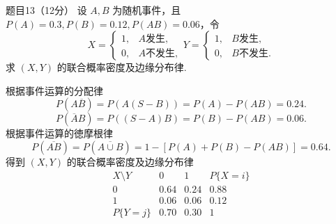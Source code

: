 \documentclass{article}
\begin{document}
\begin{question}{题目13（12分）}
    设 $A,B$ 为随机事件，且 $P(A) = 0.3, P(B) = 0.12, P(AB) = 0.06$，令
    $$
        X = \begin{cases}
            1, & A\text{发生},  \\
            0, & A\text{不发生},
        \end{cases}
        Y = \begin{cases}
            1, & B\text{发生},  \\
            0, & B\text{不发生}.
        \end{cases}
    $$
    求 $(X,Y)$ 的联合概率密度及边缘分布律.
\end{question}
\begin{solution}
    根据事件运算的分配律
    $$
        P(A\overline{B}) = P(A(S-B)) = P(A) - P(AB) = 0.24.
    $$
    $$
        P(\overline{A}B) = P((S-A)B) = P(B) - P(AB) = 0.06.
    $$
    根据事件运算的徳摩根律
    $$
        P(\overline{AB}) = P(\overline{A \cup B})
        = 1 - [P(A) + P(B) - P(AB)]
        = 0.64.
    $$
    得到 $(X,Y)$ 的联合概率密度及边缘分布律
    $$
        \begin{array}{c|cc|c}
            X \setminus Y & 0    & 1    & P\{X=i\} \\
            \hline
            0             & 0.64 & 0.24 & 0.88     \\
            1             & 0.06 & 0.06 & 0.12     \\
            \hline
            P\{Y=j\}      & 0.70 & 0.30 & 1        \\
        \end{array}
    $$
\end{solution}
\end{document}
